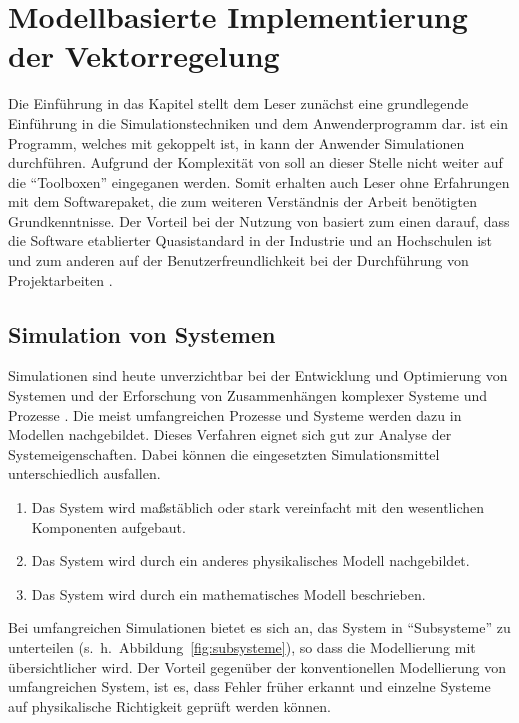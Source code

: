 
\chapter{Modellbasierte Implementierung der Vektorregelung}
\label{cha:regelungpmsm}

Die Einführung in das Kapitel stellt dem Leser zunächst eine grundlegende Einführung in die Simulationstechniken und dem Anwenderprogramm  dar.
 ist ein Programm, welches mit  gekoppelt ist, in  kann der Anwender Simulationen durchführen.
Aufgrund der Komplexität von  soll an dieser Stelle nicht weiter auf die \enquote{Toolboxen} eingeganen werden.
Somit erhalten auch Leser ohne Erfahrungen mit dem Softwarepaket, die zum weiteren Verständnis der Arbeit benötigten Grundkenntnisse.
Der Vorteil bei der Nutzung von  basiert zum einen darauf, dass die Software etablierter Quasistandard in der Industrie und an Hochschulen ist und zum anderen auf der Benutzerfreundlichkeit bei der Durchführung von Projektarbeiten \autocite{scherf2010}.

\section{Simulation von Systemen}\label{sec:simulation}

Simulationen sind heute unverzichtbar bei der Entwicklung und Optimierung von Systemen und der Erforschung von Zusammenhängen komplexer Systeme und Prozesse \autocite{brychta}.
Die meist umfangreichen Prozesse und Systeme werden dazu in Modellen nachgebildet.
Dieses Verfahren eignet sich gut zur Analyse der Systemeigenschaften.
Dabei können die eingesetzten Simulationsmittel unterschiedlich ausfallen.

\begin{enumerate}
	\item Das System wird maßstäblich oder stark vereinfacht mit den wesentlichen Komponenten aufgebaut.
	\item Das System wird durch ein anderes physikalisches Modell nachgebildet.
	\item Das System wird durch ein mathematisches Modell beschrieben.
\end{enumerate}

Bei umfangreichen Simulationen bietet es sich an, das System in \enquote{Subsysteme} zu unterteilen (s.~h.~Abbildung~\ref{fig:subsysteme}), so dass die Modellierung mit  übersichtlicher wird.
Der Vorteil gegenüber der konventionellen Modellierung von umfangreichen System, ist es, dass Fehler früher erkannt und einzelne Systeme auf physikalische Richtigkeit geprüft werden können.

